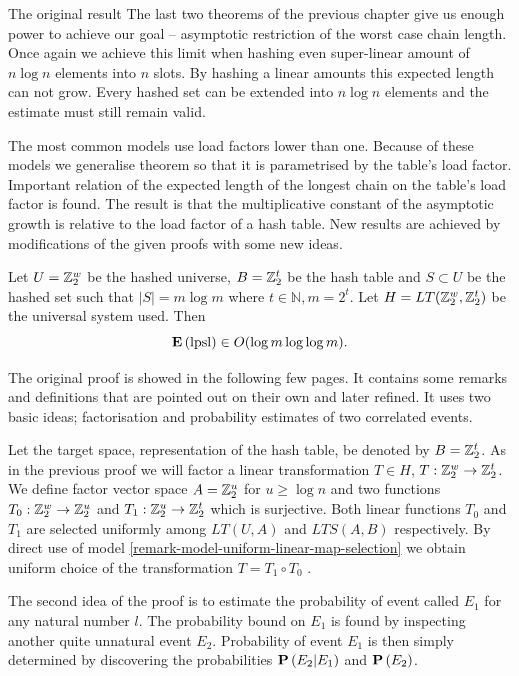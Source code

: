 \begin{section}{The original result}
The last two theorems of the previous chapter give us enough power to achieve our goal -- asymptotic restriction of the worst case chain length. Once again we achieve this limit when hashing even super-linear amount of $n \log n$ elements into $n$ slots. By hashing a linear amounts this expected length can not grow. Every hashed set can be extended into $n \log n$ elements and the estimate must still remain valid. 

The most common models use load factors lower than one. Because of these models we generalise theorem so that it is parametrised by the table's load factor. Important relation of the expected length of the longest chain on the table's load factor is found. The result is that the multiplicative constant of the asymptotic growth is relative to the load factor of a hash table. New results are achieved by modifications of the given proofs with some new ideas.

\begin{theorem}
\label{theorem-n-logn-to-n}
Let $U = \mathbb{Z}_{2}^{w}$ be the hashed universe, $B = \mathbb{Z}_{2}^{t}$ be the hash table and $S \subset U$ be the hashed set such that $|S| = m \log m$ where $t \in \mathbb{N}, m = 2 ^ t$. Let $H = LT(\mathbb{Z}_{2}^{w}, \mathbb{Z}_{2}^{t})$ be the universal system used. Then 
\[
	\mathbf{E}\left(\mathrm{lpsl}\right) \in O(\log m \log \log m) \text{.}
\]
\end{theorem}
The original proof is showed in the following few pages. It contains some remarks and definitions that are pointed out on their own and later refined. It uses two basic ideas; factorisation and probability estimates of two correlated events.

Let the target space, representation of the hash table, be denoted by $B = \mathbb{Z}_{2}^{t}$. As in the previous proof we will factor a linear transformation $T \in H$, $T: \mathbb{Z}_{2}^{w} \rightarrow \mathbb{Z}_{2}^{t}$. We define factor vector space $A = \mathbb{Z}_{2}^{u}$ for $u \geq \log n$ and two functions $T_0: \mathbb{Z}_{2}^{w} \rightarrow \mathbb{Z}_{2}^{u}$ and $T_1: \mathbb{Z}_{2}^{u} \rightarrow \mathbb{Z}_{2}^{t}$ which is surjective. Both linear functions $T_0$ and $T_1$ are selected uniformly among $LT(U, A)$ and $LTS(A, B)$ respectively. By direct use of model \ref{remark-model-uniform-linear-map-selection} we obtain uniform choice of the transformation $T = T_1 \circ T_0$ .

The second idea of the proof is to estimate the probability of event called $E_1$ for any natural number $l$. The probability bound on $E_1$ is found by inspecting another quite unnatural event $E_2$. Probability of event $E_1$ is then simply determined by discovering the probabilities $\mathbf{P}\left(E_2 | E_1\right)$ and $\mathbf{P}\left(E_2\right)$.


\end{section}
